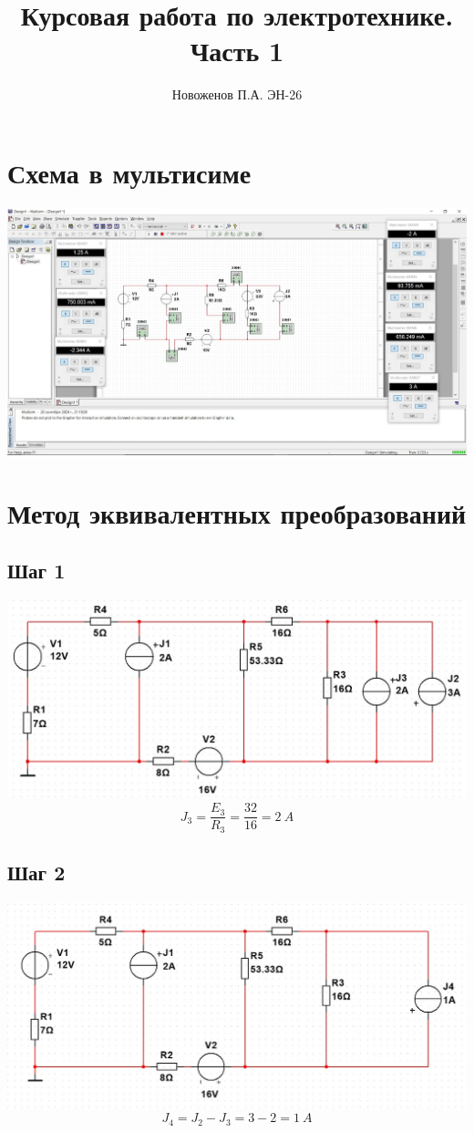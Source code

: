 \documentclass[14pt, a4paper]{article}
\title{Курсовая работа по электротехнике. Часть 1}
\author{Новоженов П.А. ЭН-26}
\date{}
\begin{document}
\maketitle

\newpage

\section*{Схема в мультисиме}

\includegraphics[width=1\textwidth]{Full_design.jpg}


\section*{Метод эквивалентных преобразований}

    \subsection*{Шаг 1}

    \includegraphics[width=1\textwidth]{Stage1.jpg}
    $$J_3 = \frac{E_3}{R_3} = \frac{32}{16} = 2 \ A$$

    \subsection*{Шаг 2}
    \includegraphics[width=1\textwidth]{Stage2.jpg}
    $$J_4 = J_2 - J_3 = 3 - 2 = 1 \ A$$
\end{document}

